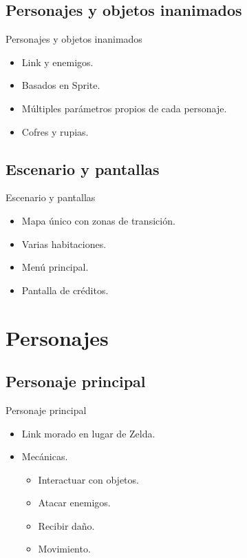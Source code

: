 \documentclass{beamer}
\begin{document}
\subsection{Personajes y objetos inanimados}

\begin{frame}{Personajes y objetos inanimados}
	\begin{itemize}
		\item Link y enemigos.
		\item Basados en Sprite.
		\item Múltiples parámetros propios de cada personaje.
		\item Cofres y rupias.
	\end{itemize}
\end{frame}

\subsection{Escenario y pantallas}

\begin{frame}{Escenario y pantallas}
	\begin{itemize}
		\item Mapa único con zonas de transición.
		\item Varias habitaciones.
		\item Menú principal.
		\item Pantalla de créditos.
	\end{itemize}
\end{frame}

\section{Personajes}

\subsection{Personaje principal}

\begin{frame}{Personaje principal}
	\begin{itemize}
		\item Link morado en lugar de Zelda.
		\item Mecánicas.
		      \begin{itemize}
			      \item Interactuar con objetos.
			      \item Atacar enemigos.
			      \item Recibir daño.
			      \item Movimiento.
		      \end{itemize}
	\end{itemize}
\end{frame}
\end{document}
